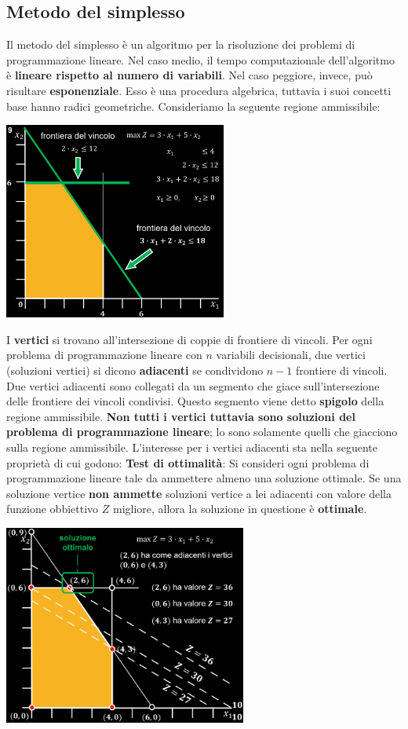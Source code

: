 \documentclass[12pt]{article}
\begin{document}
\subsection{Metodo del simplesso}
Il metodo del simplesso è un algoritmo per la risoluzione dei problemi di programmazione lineare.
Nel caso medio, il tempo computazionale dell'algoritmo è \textbf{lineare rispetto al numero di variabili}.
Nel caso peggiore, invece, può risultare \textbf{esponenziale}.
Esso è una procedura algebrica, tuttavia i suoi concetti base hanno radici geometriche.
Consideriamo la seguente regione ammissibile:
\begin{center}
    \includegraphics[width = 0.55\textwidth]{Images/18.png}
\end{center}
I \textbf{vertici} si trovano all'intersezione di coppie di frontiere di vincoli.
Per ogni problema di programmazione lineare con $n$ variabili decisionali, due vertici (soluzioni vertici)
si dicono \textbf{adiacenti} se condividono $n-1$ frontiere di vincoli.
Due vertici adiacenti sono collegati da un segmento che giace sull'intersezione delle frontiere dei vincoli condivisi.
Questo segmento viene detto \textbf{spigolo} della regione ammissibile.
\textbf{Non tutti i vertici tuttavia sono soluzioni del problema di programmazione lineare}; lo sono solamente quelli che giacciono sulla regione ammissibile.
L'interesse per i vertici adiacenti sta nella seguente proprietà di cui godono: \newline
\textbf{Test di ottimalità}: Si consideri ogni problema di programmazione lineare tale da ammettere almeno una soluzione ottimale.
Se una soluzione vertice \textbf{non ammette} soluzioni vertice a lei adiacenti con valore della funzione obbiettivo $Z$ migliore, allora la soluzione in questione è \textbf{ottimale}.
\begin{center}
    \includegraphics[width = 0.60\textwidth]{Images/19.PNG}
\end{center}
\end{document}

